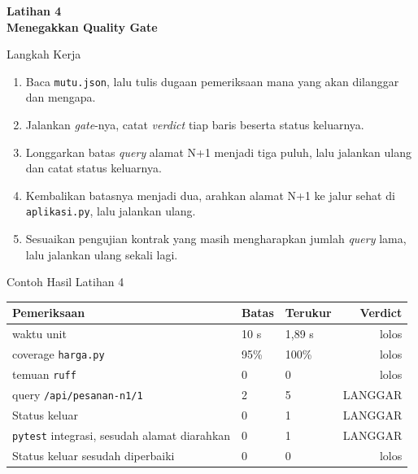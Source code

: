 \documentclass[aspectratio=169, table, 12pt]{beamer}
\begin{document}
\begin{frame}{\hfill}
  \centering
  \Huge{\textbf{Latihan 4\\Menegakkan Quality Gate}}
\end{frame}

\begin{frame}{{\Large Langkah Kerja}}
  \vspace{6pt}
  \begin{enumerate}
    \item Baca \texttt{mutu.json}, lalu tulis dugaan pemeriksaan mana yang
          akan dilanggar dan mengapa.
    \item Jalankan \textit{gate}-nya, catat \textit{verdict} tiap baris beserta
          status keluarnya.
    \item Longgarkan batas \textit{query} alamat N+1 menjadi tiga puluh, lalu
          jalankan ulang dan catat status keluarnya.
    \item Kembalikan batasnya menjadi dua, arahkan alamat N+1 ke jalur sehat
          di \texttt{aplikasi.py}, lalu jalankan ulang.
    \item Sesuaikan pengujian kontrak yang masih mengharapkan jumlah
          \textit{query} lama, lalu jalankan ulang sekali lagi.
  \end{enumerate}
\end{frame}

\begin{frame}{{\Large Contoh Hasil Latihan 4}}
  \vspace{6pt}
  \centering
  {\footnotesize
  \begin{tabularx}{\textwidth}{Yllr}
    \hline
    \textbf{Pemeriksaan} & \textbf{Batas} & \textbf{Terukur} & \textbf{Verdict} \\
    \hline
    waktu unit & 10 s & 1,89 s & lolos \\
    \hline
    coverage \texttt{harga.py} & 95\% & 100\% & lolos \\
    \hline
    temuan \texttt{ruff} & 0 & 0 & lolos \\
    \hline
    query \texttt{/api/pesanan-n1/1} & 2 & 5 & LANGGAR \\
    \hline
    Status keluar & 0 & 1 & LANGGAR \\
    \hline
    \texttt{pytest} integrasi, sesudah alamat diarahkan & 0 & 1 & LANGGAR \\
    \hline
    Status keluar sesudah diperbaiki & 0 & 0 & lolos \\
    \hline
  \end{tabularx}}
\end{frame}
\end{document}
